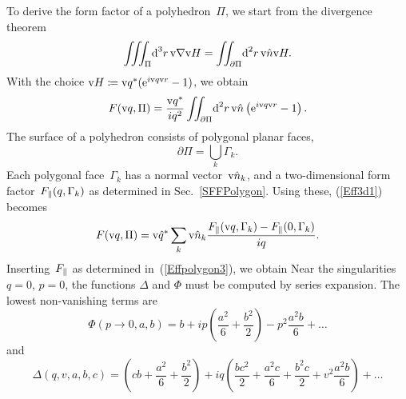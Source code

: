To derive the form factor of a polyhedron~$\Pi$,
we start from the divergence theorem
\begin{equation}
  \iiint_\Pi\!\text{d}^3r\,\text{v}{\nabla}\text{v}{H} = \iint_{\partial\Pi}\!\text{d}^2r\, \text{v}{\hat n}\text{v}{H}.
\end{equation}
With the choice $\text{v}{H}\coloneqq\text{v}{q}^*(\text{e}^{i\text{v}{q}\text{v}{r}}-1)$,
we obtain
\begin{equation}\label{Eff3d1}
  F(\text{v}{q},\Pi) = \frac{\text{v}{q}^*}{iq^2} \iint_{\partial\Pi}\!\text{d}^2r\, \text{v}{\hat n} \left(\text{e}^{i\text{v}{q}\text{v}{r}}-1\right).
\end{equation}
The surface of a polyhedron consists of polygonal planar faces,
\begin{equation}
  \partial\Pi = \bigcup_k \Gamma_k.
\end{equation}
Each polygonal face~$\Gamma_k$ has a normal vector~$\text{v}{\hat n}_k$,
and a two-dimensional form factor~$F_\parallel(q,\Gamma_k)$ as determined in Sec.~\ref{SFFPolygon}.
Using these, (\ref{Eff3d1}) becomes
\begin{equation}\label{Eff3d2}
  F(\text{v}{q},\Pi) = \text{v}{\hat q}^* \sum_k \text{v}{\hat n}_k  \frac{F_\parallel(\text{v}{q},\Gamma_k)-F_\parallel(0,\Gamma_k)}{iq}.
\end{equation}
Inserting~$F_\parallel$ as determined in~(\ref{Effpolygon3}),
we obtain
Near the singularities $q=0$, $p=0$, the functions $\Delta$ and $\Phi$
must be computed by series expansion.
The lowest non-vanishing terms are
\begin{equation}
  \Phi(p\to0,a,b)
  = b
    + ip\left(\frac{a^2}{6}+\frac{b^2}{2}\right)
    - p^2 \frac{a^2b}{6}
    + \ldots
\end{equation}
and
\begin{equation}
  \Delta(q,v,a,b,c)
  = \left(cb + \frac{a^2}{6} + \frac{b^2}{2}\right)
   + iq\left(\frac{bc^2}{2}+\frac{a^2c}{6}+\frac{b^2c}{2}+v^2\frac{a^2b}{6}\right)
   + \ldots
\end{equation}

